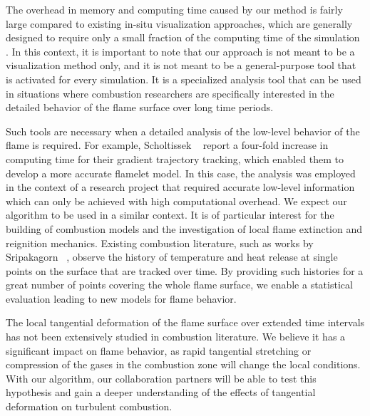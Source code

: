 %
The overhead in memory and computing time caused by our method is fairly large
compared to existing in-situ visualization approaches, which are generally
designed to require only a small fraction of the computing time of the
simulation \cite{Ma2009}.
%
In this context, it is important to note that our approach is not meant to be a
visualization method only, and it is not meant to be a general-purpose tool that
is activated for every simulation.
%
It is a specialized analysis tool that can be used in situations where
combustion researchers are specifically interested in the detailed behavior of
the flame surface over long time periods.
%

%
Such tools are necessary when a detailed analysis of the low-level behavior
of the flame is required.
%
For example, Scholtissek \etal~\cite{Scholtissek2017} report a four-fold
increase in computing time for their gradient trajectory tracking, which enabled
them to develop a more accurate flamelet model.
%
In this case, the analysis was employed in the context of a research project
that required accurate low-level information which can only be achieved with
high computational overhead.
%
We expect our algorithm to be used in a similar context.
%
It is of particular interest for the building of combustion models and the
investigation of local flame extinction and reignition mechanics.
%
Existing combustion literature, such as works by Sripakagorn
\etal~\cite{Sripakagorn2004}, observe the history of temperature and heat
release at single points on the surface that are tracked over time.
%
By providing such histories for a great number of points covering the whole
flame surface, we enable a statistical evaluation leading to new models for
flame behavior.
%

%
The local tangential deformation of the flame surface over extended time
intervals has not been extensively studied in combustion literature.
%
We believe it has a significant impact on flame behavior, as rapid tangential
stretching or compression of the gases in the combustion zone will change the
local conditions.
%
With our algorithm, our collaboration partners will be able to test this
hypothesis and gain a deeper understanding of the effects of tangential
deformation on turbulent combustion.
%
